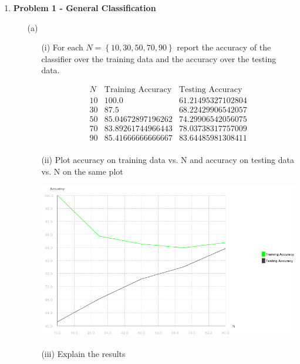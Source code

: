 \begin{enumerate}

	\item {\bf Problem 1 - General Classification}
	
		\begin{enumerate}
		
			\item[(a)] 
				
				\begin{enumerate}
				
					\item[(i)]
					For each \(N = \left\{ 10, 30, 50, 70, 90 \right\} \) report the accuracy of the classifier over the training data and the accuracy over the testing data.
					
					\[
						\begin{array}{c|cc}
							N & \text{Training Accuracy} & \text{Testing Accuracy} \\
							\hline
							10 & 100.0 & 61.21495327102804 \\
							30 & 87.5 & 68.22429906542057 \\
							50 & 85.04672897196262 & 74.29906542056075 \\
							70 & 83.89261744966443 & 78.03738317757009 \\
							90 & 85.41666666666667 & 83.64485981308411 \\
						\end{array}
					\]
					
					\item[(ii)] Plot accuracy on training data vs. N and accuracy on testing data vs. N on the same plot
					
						\includegraphics[scale=0.5]{p1a-ii-graph}
										
					\item[(iii)] Explain the results
					

\end{enumerate}
\end{enumerate}
\end{enumerate}
